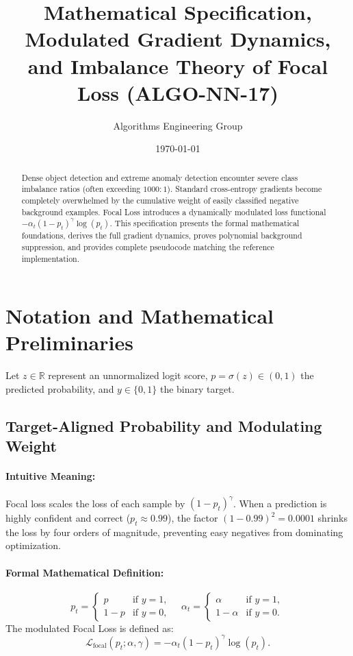 \documentclass[11pt]{article}
\title{\textbf{Mathematical Specification, Modulated Gradient Dynamics, and Imbalance Theory of Focal Loss (ALGO-NN-17)}}
\author{Algorithms Engineering Group}
\date{\today}
\begin{document}
\maketitle

\begin{abstract}
Dense object detection and extreme anomaly detection encounter severe class imbalance ratios (often exceeding $1000:1$). Standard cross-entropy gradients become completely overwhelmed by the cumulative weight of easily classified negative background examples. Focal Loss introduces a dynamically modulated loss functional $-\alpha_t (1 - p_t)^\gamma \log(p_t)$. This specification presents the formal mathematical foundations, derives the full gradient dynamics, proves polynomial background suppression, and provides complete pseudocode matching the reference implementation.
\end{abstract}

\section{Notation and Mathematical Preliminaries}
\label{sec:notation}

Let $z \in \mathbb{R}$ represent an unnormalized logit score, $p = \sigma(z) \in (0, 1)$ the predicted probability, and $y \in \{0, 1\}$ the binary target.

\subsection{Target-Aligned Probability and Modulating Weight}
\paragraph{Intuitive Meaning:} Focal loss scales the loss of each sample by $(1 - p_t)^\gamma$. When a prediction is highly confident and correct ($p_t \approx 0.99$), the factor $(1 - 0.99)^2 = 0.0001$ shrinks the loss by four orders of magnitude, preventing easy negatives from dominating optimization.

\paragraph{Formal Mathematical Definition:}
\begin{equation}
\label{eq:pt_def}
p_t = \begin{cases} p & \text{if } y = 1, \\ 1 - p & \text{if } y = 0, \end{cases} \quad \alpha_t = \begin{cases} \alpha & \text{if } y = 1, \\ 1 - \alpha & \text{if } y = 0. \end{cases}
\end{equation}
The modulated Focal Loss is defined as:
\begin{equation}
\label{eq:focal_def}
\mathcal{L}_{\mathrm{focal}}(p_t; \alpha, \gamma) = -\alpha_t (1 - p_t)^\gamma \log(p_t).
\end{equation}
\end{document}
